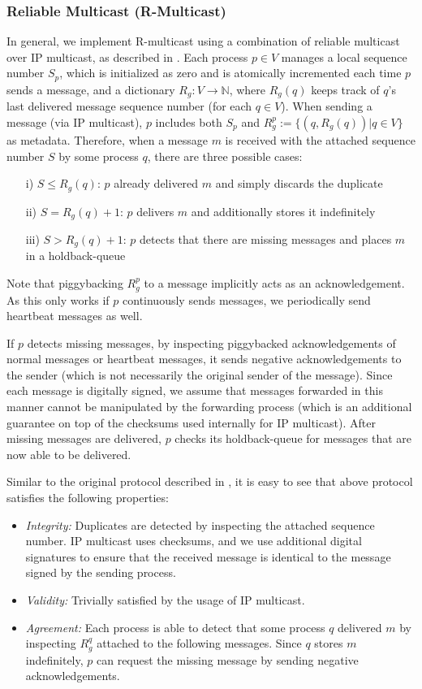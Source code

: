 \documentclass[runningheads]{llncs}
\begin{document}
\subsubsection{Reliable Multicast (R-Multicast)}
In general, we implement R-multicast using a combination of reliable multicast over IP multicast, as described in \cite[p.~649]{ds_book}. Each process $p \in V$ manages a local sequence number $S_p$, which is initialized as zero and is atomically incremented each time $p$ sends a message, and a dictionary $R_g: V \rightarrow \mathbb{N}$, where $R_g(q)$ keeps track of $q$'s last delivered message sequence number (for each $q \in V$). When sending a message (via IP multicast), $p$ includes both $S_p$ and $R_g^p := \{(q, R_g(q)) | q \in V\}$ as metadata. Therefore, when a message $m$ is received with the attached sequence number $S$ by some process $q$, there are three possible cases:
\begin{enumerate}
    \item[i)] $S \leq R_g(q)$: $p$ already delivered $m$ and simply discards the duplicate 
    \item[ii)] $S = R_g(q)+1$: $p$ delivers $m$ and additionally stores it indefinitely
    \item[iii)] $S > R_g(q)+1$: $p$ detects that there are missing messages and places $m$ in a holdback-queue   
\end{enumerate}
Note that piggybacking $R_g^p$ to a message implicitly acts as an acknowledgement. As this only works if $p$ continuously sends messages, we periodically send heartbeat messages as well. 

If $p$ detects missing messages, by inspecting piggybacked acknowledgements of normal messages or heartbeat messages, it sends negative acknowledgements to the sender (which is not necessarily the original sender of the message). Since each message is digitally signed, we assume that messages forwarded in this manner cannot be manipulated by the forwarding process (which is an additional guarantee on top of the checksums used internally for IP multicast). After missing messages are delivered, $p$ checks its holdback-queue for messages that are now able to be delivered. 

Similar to the original protocol described in \cite[p.~649]{ds_book}, it is easy to see that above protocol satisfies the following properties:
\begin{itemize}
    \item \textit{Integrity:} Duplicates are detected by inspecting the attached sequence number. IP multicast uses checksums, and we use additional digital signatures to ensure that the received message is identical to the message signed by the sending process.
    \item \textit{Validity:} Trivially satisfied by the usage of IP multicast.
    \item \textit{Agreement:} Each process is able to detect that some process $q$ delivered $m$ by inspecting $R_g^q$ attached to the following messages. Since $q$ stores $m$ indefinitely, $p$ can request the missing message by sending negative acknowledgements.
\end{itemize}
\end{document}
